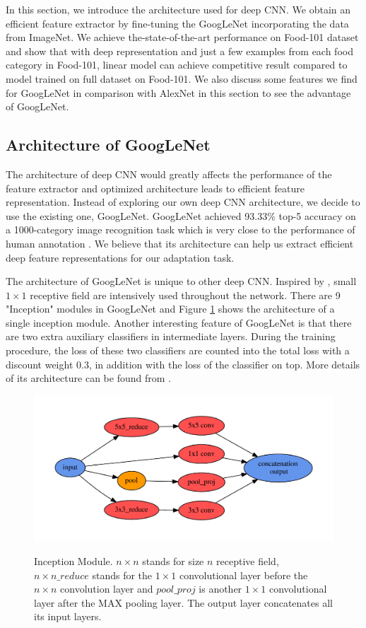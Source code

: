 ﻿In this section, we introduce the architecture used for deep CNN. We obtain an efficient feature extractor by fine-tuning the GoogLeNet incorporating the data from ImageNet. We achieve the-state-of-the-art performance on Food-101 dataset and show that with deep representation and just a few examples from each food category in Food-101, linear model can achieve competitive result compared to model trained on full dataset on Food-101. We also discuss some features we find for GoogLeNet in comparison with AlexNet \cite{krizhevsky2012imagenet} in this section to see the advantage of GoogLeNet.
\subsection{Architecture of GoogLeNet}
The architecture of deep CNN would greatly affects the performance of the feature extractor and optimized architecture leads to efficient feature representation.
Instead of exploring our own deep CNN architecture, we decide to use the existing one, GoogLeNet. GoogLeNet achieved 93.33\% top-5 accuracy on a 1000-category image recognition task which is very close to the performance of human annotation \cite{szegedy2014going}. We believe that its architecture can help us extract efficient deep feature representations for our adaptation task.

 The architecture of GoogLeNet is unique to other deep CNN. Inspired by \cite{linNiN}, small $1\times 1$ receptive field are intensively used throughout the network. There are 9 "Inception" modules in GoogLeNet and Figure \ref{incept} shows the architecture of a single inception module. Another interesting feature of GoogLeNet is that there are two extra auxiliary classifiers in intermediate layers. During the training procedure, the loss of these two classifiers are counted into the total loss with a discount weight 0.3, in addition with the loss of the classifier on top. More details of its architecture can be found from \cite{szegedy2014going}.

\begin{figure}
  \centering
  \includegraphics[scale=.45]{fig/inception.pdf}\\
  \caption{Inception Module. $n\times n$ stands for size $n$ receptive field, $n\times n\_reduce$ stands for the $1\times 1$ convolutional layer before the $n\times n$ convolution layer and $pool\_proj$ is another $1\times 1$ convolutional layer after the MAX pooling layer. The output layer concatenates all its input layers.}\label{incept}
\end{figure}

